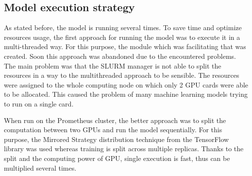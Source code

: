 \subsection{Model execution strategy}\label{subsec:model-execution-strategy}
As stated before, the model is running several times.
To save time and optimize resources usage, the first approach for running the model was to execute it in a multi-threaded way.
For this purpose, the module which was facilitating that was created.
Soon this approach was abandoned due to the encountered problems.
The main problem was that the SLURM manager is not able to split the resources in a way to the multithreaded approach to be sensible.
The resources were assigned to the whole computing node on which only 2 GPU cards were able to be allocated.
This caused the problem of many machine learning models trying to run on a single card.

When run on the Prometheus cluster, the better approach was to split the computation between two GPUs and run the model sequentially.
For this purpose, the Mirrored Strategy distribution technique from the TensorFlow library was used whereas training is split across multiple replicas.
Thanks to the split and the computing power of GPU, single execution is fast, thus can be multiplied several times.
